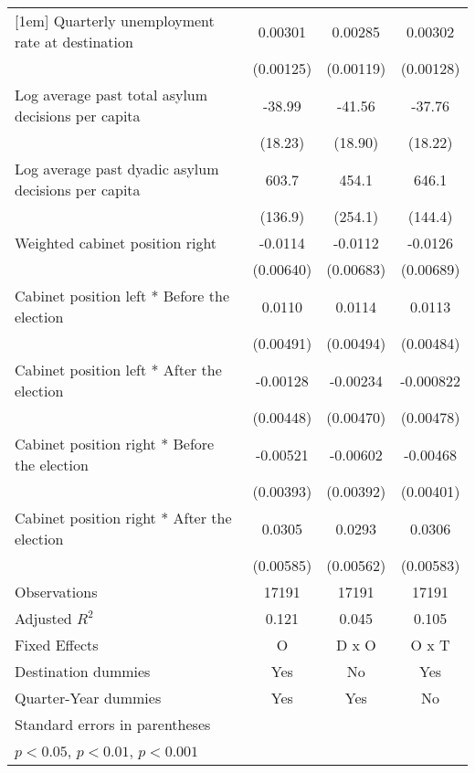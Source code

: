 \begin{table}[htbp]
\begin{tabular}{l*{3}{c}}
[1em]
Quarterly unemployment rate at destination&     0.00301\sym{*}  &     0.00285\sym{*}  &     0.00302\sym{*}  \\
                    &   (0.00125)         &   (0.00119)         &   (0.00128)         \\
[1em]
Log average past total asylum decisions per capita&      -38.99\sym{*}  &      -41.56\sym{*}  &      -37.76\sym{*}  \\
                    &     (18.23)         &     (18.90)         &     (18.22)         \\
[1em]
Log average past dyadic asylum decisions per capita&       603.7\sym{***}&       454.1         &       646.1\sym{***}\\
                    &     (136.9)         &     (254.1)         &     (144.4)         \\
[1em]
Weighted cabinet position right&     -0.0114         &     -0.0112         &     -0.0126         \\
                    &   (0.00640)         &   (0.00683)         &   (0.00689)         \\
[1em]
Cabinet position left * Before the election&      0.0110\sym{*}  &      0.0114\sym{*}  &      0.0113\sym{*}  \\
                    &   (0.00491)         &   (0.00494)         &   (0.00484)         \\
[1em]
Cabinet position left * After the election&    -0.00128         &    -0.00234         &   -0.000822         \\
                    &   (0.00448)         &   (0.00470)         &   (0.00478)         \\
[1em]
Cabinet position right * Before the election&    -0.00521         &    -0.00602         &    -0.00468         \\
                    &   (0.00393)         &   (0.00392)         &   (0.00401)         \\
[1em]
Cabinet position right * After the election&      0.0305\sym{***}&      0.0293\sym{***}&      0.0306\sym{***}\\
                    &   (0.00585)         &   (0.00562)         &   (0.00583)         \\
\hline
Observations        &       17191         &       17191         &       17191         \\
Adjusted \(R^{2}\)  &       0.121         &       0.045         &       0.105         \\
Fixed Effects       &           O         &       D x O         &       O x T         \\
Destination dummies &         Yes         &          No         &         Yes         \\
Quarter-Year dummies&         Yes         &         Yes         &          No         \\
\hline\hline
\multicolumn{4}{l}{\footnotesize Standard errors in parentheses}\\
\multicolumn{4}{l}{\footnotesize \sym{*} \(p<0.05\), \sym{**} \(p<0.01\), \sym{***} \(p<0.001\)}\\
\end{tabular}
\end{table}
